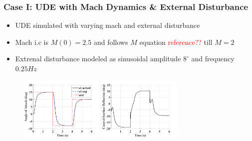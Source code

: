 \documentclass[table,10pt,red]{beamer}	%
\begin{document}
\begin{frame}
\frametitle{Case I: UDE with Mach Dynamics \& External Disturbance}

\begin{itemize}
	\item UDE simulated with varying mach and external disturbance
	\item Mach i.c is $M(0) = 2.5$ and follows $M$ equation \textcolor{red}{reference??} till $M = 2$
	\item Extrenal disturbance modeled as sinusoidal amplitude $8^\circ$ and frequency $0.25 Hz$
\end{itemize}

\begin{figure}
\includegraphics[width=4cm]{1_ude_varying-mach_x1}
\includegraphics[width=4cm]{2_ude_varying-mach_control}
\end{figure}


\end{frame}	
\end{document}

